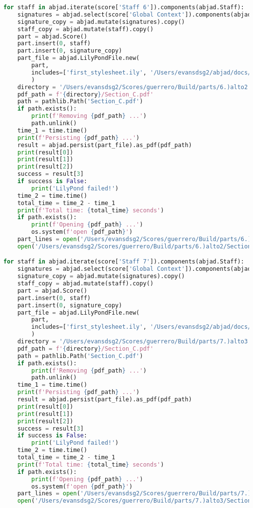 \begin{lstlisting}[language=Python, caption=Invocation Source Code]
for staff in abjad.iterate(score['Staff 6']).components(abjad.Staff):
    signatures = abjad.select(score['Global Context']).components(abjad.Staff)
    signature_copy = abjad.mutate(signatures).copy()
    staff_copy = abjad.mutate(staff).copy()
    part = abjad.Score()
    part.insert(0, staff)
    part.insert(0, signature_copy)
    part_file = abjad.LilyPondFile.new(
        part,
        includes=['first_stylesheet.ily', '/Users/evansdsg2/abjad/docs/source/_stylesheets/abjad.ily'],
        )
    directory = '/Users/evansdsg2/Scores/guerrero/Build/parts/6.)alto2'
    pdf_path = f'{directory}/Section_C.pdf'
    path = pathlib.Path('Section_C.pdf')
    if path.exists():
        print(f'Removing {pdf_path} ...')
        path.unlink()
    time_1 = time.time()
    print(f'Persisting {pdf_path} ...')
    result = abjad.persist(part_file).as_pdf(pdf_path)
    print(result[0])
    print(result[1])
    print(result[2])
    success = result[3]
    if success is False:
        print('LilyPond failed!')
    time_2 = time.time()
    total_time = time_2 - time_1
    print(f'Total time: {total_time} seconds')
    if path.exists():
        print(f'Opening {pdf_path} ...')
        os.system(f'open {pdf_path}')
    part_lines = open('/Users/evansdsg2/Scores/guerrero/Build/parts/6.)alto2/Section_C.ly').readlines()
    open('/Users/evansdsg2/Scores/guerrero/Build/parts/6.)alto2/Section_C.ly', 'w').writelines(part_lines[15:-1])

for staff in abjad.iterate(score['Staff 7']).components(abjad.Staff):
    signatures = abjad.select(score['Global Context']).components(abjad.Staff)
    signature_copy = abjad.mutate(signatures).copy()
    staff_copy = abjad.mutate(staff).copy()
    part = abjad.Score()
    part.insert(0, staff)
    part.insert(0, signature_copy)
    part_file = abjad.LilyPondFile.new(
        part,
        includes=['first_stylesheet.ily', '/Users/evansdsg2/abjad/docs/source/_stylesheets/abjad.ily'],
        )
    directory = '/Users/evansdsg2/Scores/guerrero/Build/parts/7.)alto3'
    pdf_path = f'{directory}/Section_C.pdf'
    path = pathlib.Path('Section_C.pdf')
    if path.exists():
        print(f'Removing {pdf_path} ...')
        path.unlink()
    time_1 = time.time()
    print(f'Persisting {pdf_path} ...')
    result = abjad.persist(part_file).as_pdf(pdf_path)
    print(result[0])
    print(result[1])
    print(result[2])
    success = result[3]
    if success is False:
        print('LilyPond failed!')
    time_2 = time.time()
    total_time = time_2 - time_1
    print(f'Total time: {total_time} seconds')
    if path.exists():
        print(f'Opening {pdf_path} ...')
        os.system(f'open {pdf_path}')
    part_lines = open('/Users/evansdsg2/Scores/guerrero/Build/parts/7.)alto3/Section_C.ly').readlines()
    open('/Users/evansdsg2/Scores/guerrero/Build/parts/7.)alto3/Section_C.ly', 'w').writelines(part_lines[15:-1])


\end{lstlisting}
